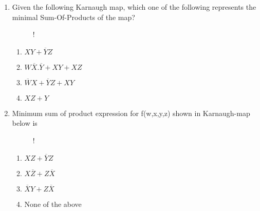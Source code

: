\documentclass[journal,12pt,twocolumn]{IEEEtran}
\begin{document}
\begin{enumerate}
    \begin{figure}[!h]
\centering
\resizebox {\columnwidth} {!} {

}
\caption{}
\end{figure} 

    \item Given the following Karnaugh map, which one of the following represents the
minimal Sum-Of-Products of the map?
\begin{figure}[!h]
\centering
\resizebox {\columnwidth} {!} {

}
\caption{}
\end{figure} 

     \begin{enumerate}
      \item $XY+\overline{Y}Z$ 
      \item $W\overline{X}.\overline{Y}+XY+XZ$
      \item $\overline{W}X+\overline{Y}Z+XY$
      \item $XZ+Y$
    \end{enumerate}
     
    \item Minimum sum of product expression for f(w,x,y,z) shown in Karnaugh-map below
is
\begin{figure}[!h]
\centering
\resizebox {\columnwidth} {!} {

}
\caption{}
\end{figure}
     \begin{enumerate}
      \item $XZ+\overline{Y}Z$ 
      \item $X\overline{Z}+Z\overline{X}$
      \item $\overline{X}Y+Z\overline{X}$
      \item None of the above
    \end{enumerate}


\end{enumerate}
\end{document}
